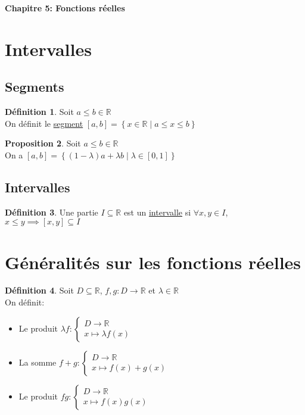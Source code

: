 \documentclass[10pt,a4paper]{article}
\theoremstyle{definition}
\newtheorem{proposition}{Proposition}[section]
\newtheorem{definition}[proposition]{Définition}
\begin{document}
\renewcommand{\labelitemi}{$*$}
\begin{center}
{\Large \textbf{Chapitre 5: Fonctions réelles}}
\end{center}

\section{Intervalles}
\subsection{Segments}
\begin{definition}
Soit $a \leq b \in \mathbb{R}$ \\
On définit le \uline{segment} $[a, b] = \left\{ x \in \mathbb{R} \mid a \leq x \leq b \right\}$
\end{definition}
\begin{proposition}
Soit $a \leq b \in \mathbb{R}$ \\
On a $[a, b] = \left\{ (1 - \lambda) a + \lambda b \mid \lambda \in [0, 1] \right\}$
\end{proposition}

\subsection{Intervalles}
\begin{definition}
Une partie $I \subseteq \mathbb{R}$ est un \uline{intervalle} si $\forall x, y \in I$, $x \leq y \implies [x, y] \subseteq I$
\end{definition}

\section{Généralités sur les fonctions réelles}
\begin{definition}
Soit $D \subseteq \mathbb{R}$, $f, g: D \to \mathbb{R}$ et $\lambda \in \mathbb{R}$ \\
On définit:
\begin{itemize}
\item Le produit $\lambda f: \begin{cases}
D \to \mathbb{R} \\
x \mapsto \lambda f(x)
\end{cases}$
\item La somme $f + g: \begin{cases}
D \to \mathbb{R} \\
x \mapsto f(x) + g(x)
\end{cases}$
\item Le produit $f g: \begin{cases}
D \to \mathbb{R} \\
x \mapsto f(x) g(x)
\end{cases}$
\end{itemize}
\end{definition}
\end{document}
